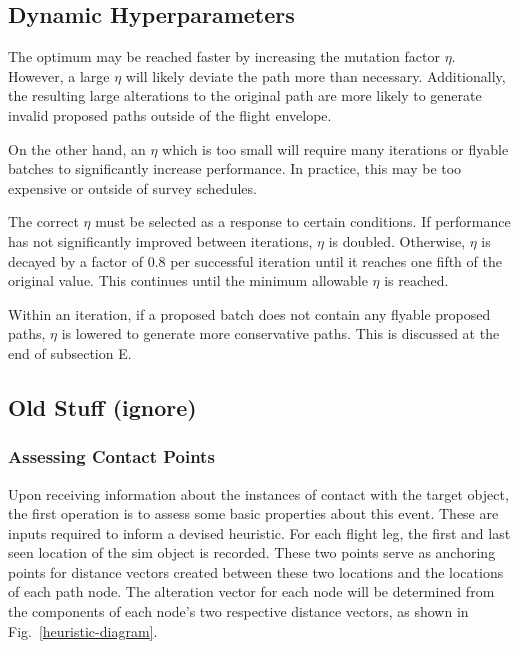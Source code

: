 \documentclass[conf]{new-aiaa}
\begin{document}
\subsection{Dynamic Hyperparameters}
The optimum may be reached faster by increasing the mutation factor $\eta$. However, a large $\eta$ will likely deviate the path more than necessary. Additionally, the resulting large alterations to the original path are more likely to generate invalid proposed paths outside of the flight envelope.

On the other hand, an $\eta$ which is too small will require many iterations or flyable batches to significantly increase performance. In practice, this may be too expensive or outside of survey schedules.

The correct $\eta$ must be selected as a response to certain conditions. If performance has not significantly improved between iterations, $\eta$ is doubled. Otherwise, $\eta$ is decayed by a factor of 0.8 per successful iteration until it reaches one fifth of the original value. This continues until the minimum allowable $\eta$ is reached.

Within an iteration, if a proposed batch does not contain any flyable proposed paths, $\eta$ is lowered to generate more conservative paths. This is discussed at the end of subsection E.












\iffalse


\subsection{Old Stuff (ignore)}
\subsubsection{Assessing Contact Points}
Upon receiving information about the instances of contact with the target object, the first operation is to assess some basic properties about this event. These are inputs required to inform a devised heuristic. For each flight leg, the first and last seen location of the sim object is recorded. These two points serve as anchoring points for distance vectors created between these two locations and the locations of each path node. The alteration vector for each node will be determined from the components of each node's two respective distance vectors, as shown in Fig.~\ref{heuristic-diagram}.
\end{document}
